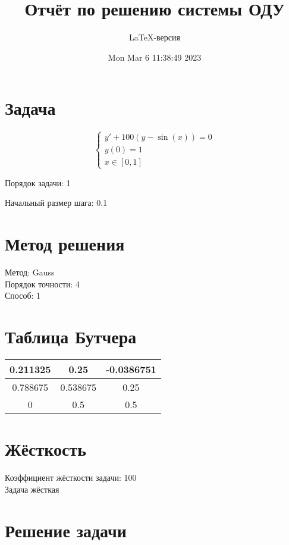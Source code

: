 \documentclass[a4paper,14pt]{extarticle}
\title{Отчёт по решению системы ОДУ}
\author{LaTeX-версия}
\date{Mon Mar  6 11:38:49 2023}
\begin{document}
\maketitle

\tableofcontents
\pagebreak

\section{Задача}

$$
\begin{cases}
	y' + 100(y - \sin(x)) = 0\\
	y(0) = 1\\
	x \in [0, 1]
\end{cases}
$$

Порядок задачи: 1

Начальный размер шага: 0.1

\section{Метод решения}

Метод: Gauss\\
Порядок точности: 4\\
Способ: 1

\section{Таблица Бутчера}

\begin{table}[h]
\centering
\begin{tabular}{|c||c|c|}
\hline
0.211325 & 0.25 & -0.0386751\\
\hline
0.788675 & 0.538675 & 0.25\\
\hline
0 & \cellcolor{lightgray} 0.5 & \cellcolor{lightgray} 0.5\\
\hline
\end{tabular}
\end{table}

\section{Жёсткость}

Коэффициент жёсткости задачи: 100\\
Задача жёсткая

\section{Решение задачи}
\end{document}
